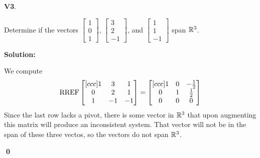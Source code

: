 \documentclass{article}
\newenvironment{problem}[1]
{
  \begin{flushleft}
  \textbf{#1}.
  \ignorespaces
}
{
  \end{flushleft}
}
\newenvironment{solution}
{
  \ignorespaces
  \textbf{Solution:}
}
{
  \ignorespacesafterend
  \begin{flushright}
  {\bfseries \qed}
  \end{flushright}
}
\begin{document}
\begin{problem}{V3}
Determine if  the vectors
\(\begin{bmatrix} 1 \\ 0 \\ 1 \end{bmatrix} \),
\(\begin{bmatrix} 3 \\ 2 \\ -1 \end{bmatrix} \), and
\(\begin{bmatrix} 1 \\ 1 \\ -1 \end{bmatrix} \) span \(\mathbb{R}^3\).
\end{problem}
\begin{solution}

We compute
\[ \operatorname{RREF}
  \begin{bmatrix}[ccc]
  1 & 3 & 1  \\
  0 & 2 & 1  \\
  1 & -1 & -1
  \end{bmatrix}
  =
  \begin{bmatrix}[ccc]
  1 & 0 & -\frac{1}{2} \\
  0 & 1 & \frac{1}{2} \\
  0 & 0 & 0
  \end{bmatrix}
\]
Since the last row lacks a pivot, there is some vector in \(\mathbb{R}^3\) that upon augmenting this matrix will produce
an inconsistent system. That vector will not be in the span of these three vectos, so the vectors do not span \(\mathbb{R}^3\).
\end{solution}
\end{document}
